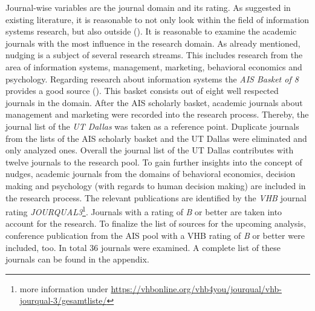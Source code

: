 Journal-wise variables are the journal domain and its rating. As suggested in existing literature, it is reasonable to not only look within the field of information systems research, but also outside (\cite{webster_analyzing_2002}). It is reasonable to examine the academic journals with the most influence in the research domain. As already mentioned, nudging is a subject of several research streams. This includes research from the area of information systems, management, marketing, behavioral economics and psychology. Regarding research about information systems the \textit{AIS Basket of 8} provides a good source (\cite{alavi_review_1992}). This basket consists out of eight well respected journals in the domain. After the AIS scholarly basket, academic journals about management and marketing were recorded into the research process. Thereby, the journal list of the \textit{UT Dallas} was taken as a reference point. Duplicate journals from the lists of the AIS scholarly basket and the UT Dallas were eliminated and only analyzed ones. Overall the journal list of the UT Dallas contributes with twelve journals to the research pool. To gain further insights into the concept of nudges, academic journals from the domains of behavioral economics, decision making and psychology (with regards to human decision making) are included in the research process. The relevant publications are identified by the \textit{VHB} journal rating \textit{JOURQUAL3}\footnote{more information under \url{https://vhbonline.org/vhb4you/jourqual/vhb-jourqual-3/gesamtliste/}}. Journals with a rating of \textit{B} or better are taken into account for the research. To finalize the list of sources for the upcoming analysis, conference publication from the AIS pool with a VHB rating of \textit{B} or better were included, too. In total 36 journals were examined. A complete list of these journals can be found in the appendix.

